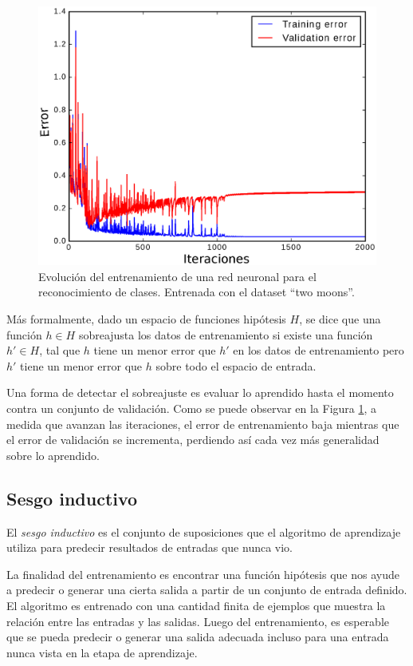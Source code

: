 \documentclass[spanish]{report}
\begin{document}
\begin{figure}[H]
\centering
 \includegraphics[width=\linewidth]{overfitplot.eps}
  \caption{Evolución del entrenamiento de una red neuronal para el reconocimiento de clases. Entrenada con el dataset ``two moons''.}
  \label{fig:overfitplot}
\end{figure}


Más formalmente, dado un espacio de funciones hipótesis $H$, se dice que una función $h \in H$ sobreajusta los datos de entrenamiento si existe una función $h' \in H$, tal que $h$ tiene un menor error que $h'$ en los datos de entrenamiento pero $h'$ tiene un menor error que $h$ sobre todo el espacio de entrada.
\newline

Una forma de detectar el sobreajuste es evaluar lo aprendido hasta el momento contra un conjunto de validación. Como se puede observar en la Figura \ref{fig:overfitplot}, a medida que avanzan las iteraciones, el error de entrenamiento baja mientras que el error de validación se incrementa, perdiendo así cada vez más generalidad sobre lo aprendido.


\subsection{Sesgo inductivo}

El \textit{sesgo inductivo} es el conjunto de suposiciones que el algoritmo de aprendizaje utiliza para predecir resultados de entradas que nunca vio.

La finalidad del entrenamiento es encontrar una función hipótesis que nos ayude a predecir o generar una cierta salida a partir de un conjunto de entrada definido. El algoritmo es entrenado con una cantidad finita de ejemplos que muestra la relación entre las entradas y las salidas. Luego del entrenamiento, es esperable que se pueda predecir o generar una salida adecuada incluso para una entrada nunca vista en la etapa de aprendizaje.
\end{document}
